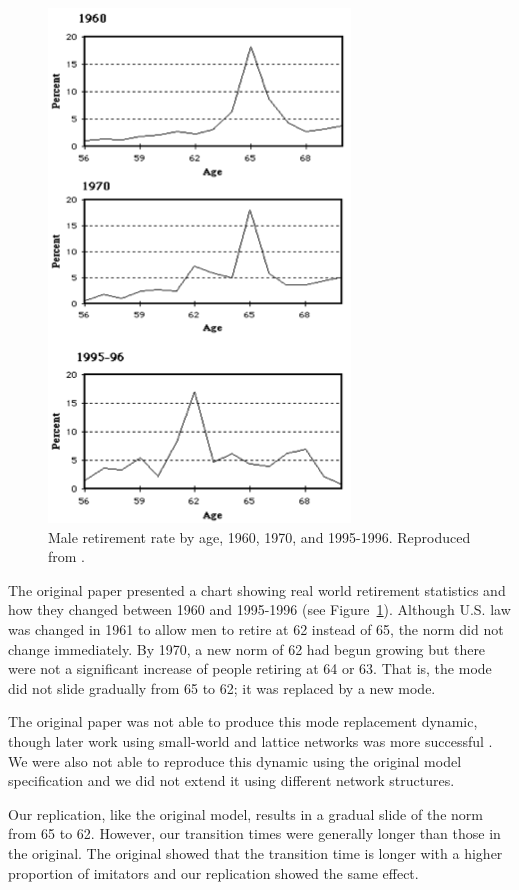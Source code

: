 \documentclass[runningheads,a4paper]{article}
\begin{document}
\begin{figure}
 \begin{center}
  \includegraphics[scale=.60]{figs/figure1.png}
\caption{Male retirement rate by age, 1960, 1970, and 1995-1996. Reproduced from \cite{axtell_coordination_2006}.}
\label{fig:real-data}
 \end{center}
\end{figure}

The original paper presented a chart showing real world retirement statistics and how they changed between 1960 and 1995-1996 (see Figure~\ref{fig:real-data}). 
Although U.S. law was changed in 1961 to allow men to retire at 62 instead of 65, the norm did not change immediately. 
By 1970, a new norm of 62 had begun growing but there were not a significant increase of people retiring at 64 or 63. 
That is, the mode did not slide gradually from 65 to 62; it was replaced by a new mode.

The original paper was not able to produce this mode replacement dynamic, though later work using small-world and lattice networks was more successful \cite{axtell2001effects}. We were also not able to reproduce this dynamic using the original model specification and we did not extend it using different network structures.

Our replication, like the original model, results in a gradual slide of the norm from 65 to 62. 
However, our transition times were generally longer than those in the original. 
The original showed that the transition time is longer with a higher proportion of imitators and our replication showed the same effect.
\end{document}
